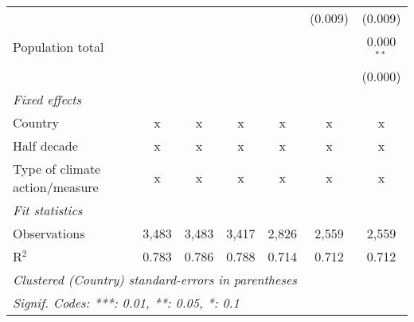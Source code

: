 \begin{tabular}{lcccccc}
                                        &         &         &             &                & (0.009)        & (0.009)\\   
   Population total                     &         &         &             &                &                & 0.000$^{**}$\\   
                                        &         &         &             &                &                & (0.000)\\   
   \emph{Fixed effects}\\
   Country                              & x       & x       & x           & x              & x              & x\\  
   Half decade                          & x       & x       & x           & x              & x              & x\\  
   Type of climate action/measure       & x       & x       & x           & x              & x              & x\\  
   \midrule \emph{Fit statistics}\\
   Observations                         & 3,483   & 3,483   & 3,417       & 2,826          & 2,559          & 2,559\\  
   R$^2$                                & 0.783   & 0.786   & 0.788       & 0.714          & 0.712          & 0.712\\  
   \midrule
   \multicolumn{7}{l}{\emph{Clustered (Country) standard-errors in parentheses}}\\
   \multicolumn{7}{l}{\emph{Signif. Codes: ***: 0.01, **: 0.05, *: 0.1}}\\
\end{tabular}
\par\endgroup



